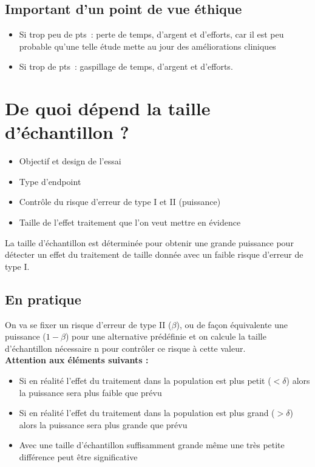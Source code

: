 \subsection{Important d’un point de vue éthique}
\begin{itemize}
    \item Si trop peu de pts : perte de temps, d’argent et d’efforts, car il est peu probable qu’une telle étude mette au jour des améliorations cliniques
    \item Si trop de pts : gaspillage de temps, d’argent et d’efforts.
\end{itemize}

\section{De quoi dépend la taille d’échantillon ?}
\begin{itemize}
    \item Objectif et design de l’essai
    \item Type d’endpoint
    \item Contrôle du risque d’erreur de type I et II (puissance) 
    \item Taille de l’effet traitement que l’on veut mettre en évidence
\end{itemize}

\vspace{0.15cm}

 La taille d’échantillon est déterminée pour obtenir une grande puissance pour détecter un effet du traitement de taille donnée avec un faible risque d’erreur de type I.
 
\subsection{En pratique}
On va se fixer un risque d’erreur de type II ($\beta$), ou de façon équivalente une puissance ($1 − \beta$) pour une alternative prédéfinie et on calcule la taille d’échantillon nécessaire n pour contrôler ce risque à cette valeur.\\

\textbf{Attention aux éléments suivants :}
\begin{itemize}
    \item Si en réalité l’effet du traitement dans la population est plus petit ($< \delta$) alors la puissance sera plus faible que prévu
    \item Si en réalité l’effet du traitement dans la population est plus grand ($> \delta $) alors la puissance sera plus grande que prévu
    \item Avec une taille d’échantillon suffisamment grande même une très petite différence peut être significative
\end{itemize}

